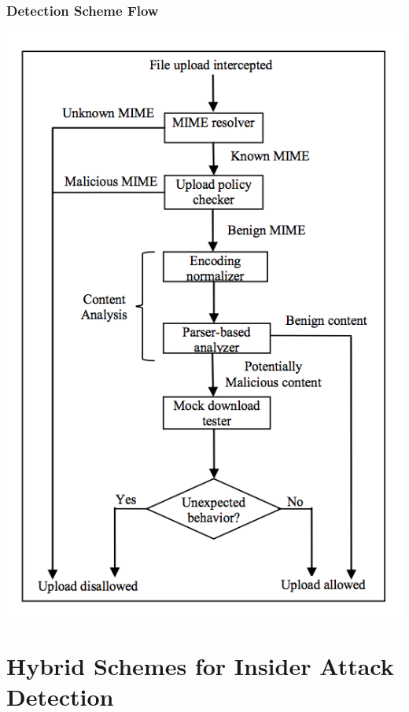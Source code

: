 \documentclass[10pt,mathserif]{beamer}
\begin{document}
\begin{frame}
  \frametitle{Detection Scheme Flow}
  \begin{center}
    \vspace{-0.2cm}
    \includegraphics[height=0.9\textheight,natwidth=545,natheight=802]{figures/content_sniff_flow.png}
  \end{center}
\end{frame}

\section{Hybrid Schemes for Insider Attack Detection}
\end{document}
